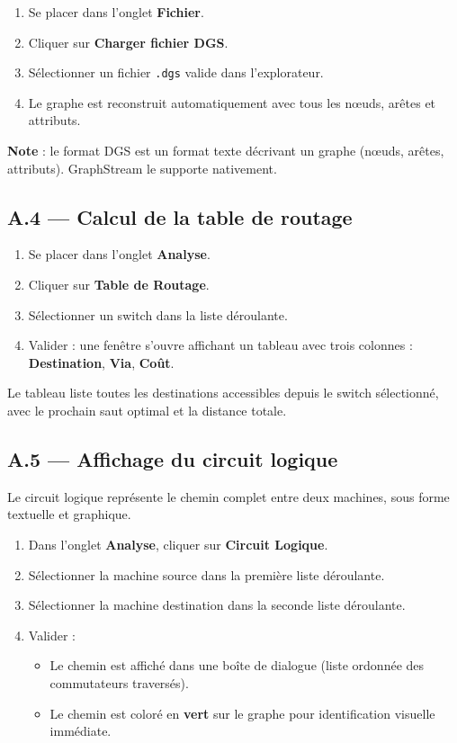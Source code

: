 \documentclass[12pt, a4paper]{article}
\begin{document}
\begin{enumerate}
    \item Se placer dans l'onglet \textbf{Fichier}.
    \item Cliquer sur \textbf{Charger fichier DGS}.
    \item Sélectionner un fichier \texttt{.dgs} valide dans l'explorateur.
    \item Le graphe est reconstruit automatiquement avec tous les nœuds, arêtes et attributs.
\end{enumerate}

\textbf{Note} : le format DGS est un format texte décrivant un graphe (nœuds, arêtes, attributs). GraphStream le supporte nativement.

\subsection*{A.4 --- Calcul de la table de routage}

\begin{enumerate}
    \item Se placer dans l'onglet \textbf{Analyse}.
    \item Cliquer sur \textbf{Table de Routage}.
    \item Sélectionner un switch dans la liste déroulante.
    \item Valider : une fenêtre s'ouvre affichant un tableau avec trois colonnes : \textbf{Destination}, \textbf{Via}, \textbf{Coût}.
\end{enumerate}

Le tableau liste toutes les destinations accessibles depuis le switch sélectionné, avec le prochain saut optimal et la distance totale.

\subsection*{A.5 --- Affichage du circuit logique}

Le circuit logique représente le chemin complet entre deux machines, sous forme textuelle et graphique.

\begin{enumerate}
    \item Dans l'onglet \textbf{Analyse}, cliquer sur \textbf{Circuit Logique}.
    \item Sélectionner la machine source dans la première liste déroulante.
    \item Sélectionner la machine destination dans la seconde liste déroulante.
    \item Valider : 
    \begin{itemize}
        \item Le chemin est affiché dans une boîte de dialogue (liste ordonnée des commutateurs traversés).
        \item Le chemin est coloré en \textbf{vert} sur le graphe pour identification visuelle immédiate.
    \end{itemize}
\end{enumerate}
\end{document}
